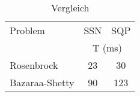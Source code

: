 
\begin{table}[h]
\centering
\begin{tabular*}{0.5\linewidth}{@{\extracolsep{\fill}}lcc}
  \toprule
  Problem &   SSN   &   SQP   \\
  \cmidrule{2-3}
          & \multicolumn{2}{c}{T (ms)} \\
  \midrule
  Rosenbrock     &  23  &  30  \\
  Bazaraa-Shetty &  90  & 123  \\
  \bottomrule
\end{tabular*}
\caption{Vergleich}
\end{table}
